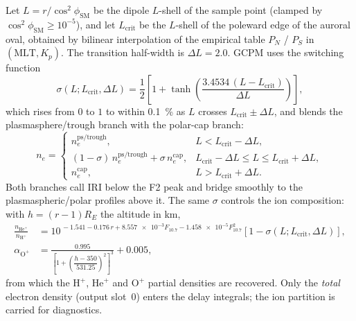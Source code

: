 Let $L = r/\cos^2\phi_\mathrm{SM}$ be the dipole $L$-shell of the sample point
(clamped by $\cos^2\phi_\mathrm{SM}\ge 10^{-5}$), and let $L_\mathrm{crit}$ be the
$L$-shell of the poleward edge of the auroral oval, obtained by bilinear
interpolation of the empirical table $P_N$ / $P_S$ in $(\mathrm{MLT},K_p)$.  The
transition half-width is $\Delta L = 2.0$.  GCPM uses the switching function
%
\begin{equation}
  \label{eq:iono-switchon}
  \sigma(L; L_\mathrm{crit}, \Delta L)
  = \frac{1}{2}\left[1 + \tanh\!\left(\frac{3.4534\,(L - L_\mathrm{crit})}{\Delta L}\right)\right] ,
\end{equation}
%
which rises from $0$ to $1$ to within \SI{0.1}{\percent} as $L$ crosses
$L_\mathrm{crit} \pm \Delta L$, and blends the plasmasphere/trough branch with
the polar-cap branch:
%
\begin{equation}
  \label{eq:iono-blend}
  n_e =
  \begin{cases}
    n_e^\mathrm{ps/trough}, & L < L_\mathrm{crit} - \Delta L, \\[4pt]
    (1-\sigma)\,n_e^\mathrm{ps/trough} + \sigma\,n_e^\mathrm{cap},
      & L_\mathrm{crit} - \Delta L \le L \le L_\mathrm{crit} + \Delta L, \\[4pt]
    n_e^\mathrm{cap}, & L > L_\mathrm{crit} + \Delta L .
  \end{cases}
\end{equation}
%
Both branches call IRI below the F2 peak and bridge smoothly to the
plasmaspheric/polar profiles above it.  The same $\sigma$ controls the ion
composition: with $h = (r-1)R_E$ the altitude in \si{\kilo\meter},
%
\begin{align}
  \label{eq:iono-composition}
  \frac{n_{\mathrm{He}^+}}{n_{\mathrm{H}^+}}
    &= 10^{\,-1.541 - 0.176\,r + \num{8.557e-3}F_{10.7} - \num{1.458e-5}F_{10.7}^2}
       \left[1 - \sigma(L; L_\mathrm{crit}, \Delta L)\right], \\
  \alpha_{\mathrm{O}^+}
    &= \frac{0.995}{\left[1 + \left(\dfrac{h - 350}{531.25}\right)^{2}\right]^{3}} + 0.005 ,
\end{align}
%
from which the $\mathrm{H}^+$, $\mathrm{He}^+$ and $\mathrm{O}^+$ partial
densities are recovered.
Only the \emph{total} electron density (output slot~0) enters the delay
integrals; the ion partition is carried for diagnostics.

